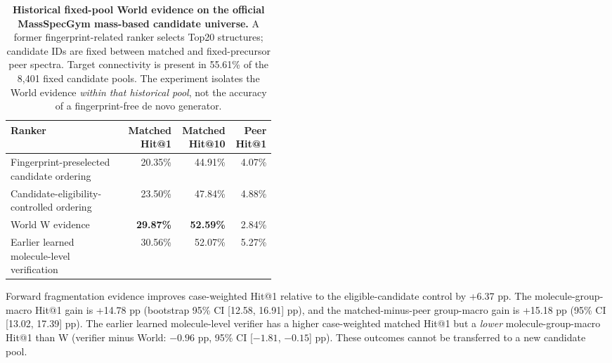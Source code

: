 \begin{table}[!htbp]
\centering
\caption{\textbf{Historical fixed-pool World evidence on the official MassSpecGym mass-based candidate universe.} A former fingerprint-related ranker selects Top20 structures; candidate IDs are fixed between matched and fixed-precursor peer spectra. Target connectivity is present in 55.61\% of the 8,401 fixed candidate pools. The experiment isolates the World evidence \emph{within that historical pool}, not the accuracy of a fingerprint-free de novo generator.}
\label{tab:msdev_fp20}
\small
\setlength{\tabcolsep}{4pt}
\begin{tabular}{p{0.44\linewidth}rrr}
\toprule
Ranker & Matched Hit@1 & Matched Hit@10 & Peer Hit@1 \\
\midrule
Fingerprint-preselected candidate ordering & 20.35\% & 44.91\% & 4.07\% \\
Candidate-eligibility-controlled ordering & 23.50\% & 47.84\% & 4.88\% \\
World W evidence & \textbf{29.87\%} & \textbf{52.59\%} & 2.84\% \\
Earlier learned molecule-level verification & 30.56\% & 52.07\% & 5.27\% \\
\bottomrule
\end{tabular}
\vspace{3pt}
\begin{minipage}{0.97\linewidth}\footnotesize
Forward fragmentation evidence improves case-weighted Hit@1 relative to the eligible-candidate control by +6.37 pp. The molecule-group-macro Hit@1 gain is +14.78 pp (bootstrap 95\% CI [12.58, 16.91] pp), and the matched-minus-peer group-macro gain is +15.18 pp (95\% CI [13.02, 17.39] pp). The earlier learned molecule-level verifier has a higher case-weighted matched Hit@1 but a \emph{lower} molecule-group-macro Hit@1 than W (verifier minus World: $-0.96$ pp, 95\% CI [$-1.81$, $-0.15$] pp). These outcomes cannot be transferred to a new candidate pool.
\end{minipage}
\end{table}

